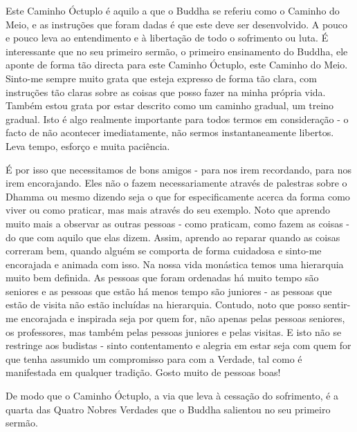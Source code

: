 Este Caminho Óctuplo é aquilo a que o Buddha se referiu como o Caminho
do Meio, e as instruções que foram dadas é que este deve ser
desenvolvido. A pouco e pouco leva ao entendimento e à libertação de
todo o sofrimento ou luta. É interessante que no seu primeiro sermão, o
primeiro ensinamento do Buddha, ele aponte de forma tão directa para
este Caminho Óctuplo, este Caminho do Meio. Sinto-me sempre muito grata
que esteja expresso de forma tão clara, com instruções tão claras sobre
as coisas que posso fazer na minha própria vida. Também estou grata por
estar descrito como um caminho gradual, um treino gradual. Isto é algo
realmente importante para todos termos em consideração - o facto de não
acontecer imediatamente, não sermos instantaneamente libertos. Leva
tempo, esforço e muita paciência.

É por isso que necessitamos de bons amigos - para nos irem recordando,
para nos irem encorajando. Eles não o fazem necessariamente através de
palestras sobre o Dhamma ou mesmo dizendo seja o que for especificamente
acerca da forma como viver ou como praticar, mas mais através do seu
exemplo. Noto que aprendo muito mais a observar as outras pessoas - como
praticam, como fazem as coisas - do que com aquilo que elas dizem.
Assim, aprendo ao reparar quando as coisas correram bem, quando alguém
se comporta de forma cuidadosa e \mbox{sinto-me} encorajada e animada com isso.
Na nossa vida monástica temos uma hierarquia muito bem definida. As
pessoas que foram ordenadas há muito tempo são seniores e as pessoas que
estão há menos tempo são juniores - as pessoas que estão de visita não
estão incluídas na hierarquia. Contudo, noto que posso sentir-me
encorajada e inspirada seja por quem for, não apenas pelas pessoas
seniores, os professores, mas também pelas pessoas juniores e pelas
visitas. E isto não se restringe aos budistas - sinto contentamento e
alegria em estar seja com quem for que tenha assumido um compromisso
para com a Verdade, tal como é manifestada em qualquer tradição. Gosto
muito de pessoas boas!

De modo que o Caminho Óctuplo, a via que leva à cessação do sofrimento,
é a quarta das Quatro Nobres Verdades que o Buddha salientou no seu
primeiro sermão.

